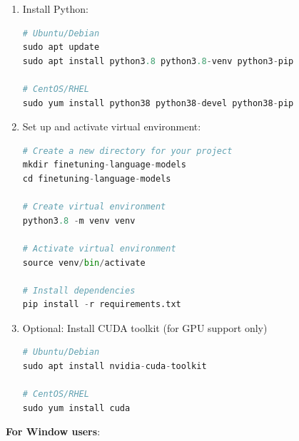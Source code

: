 \begin{enumerate}
\item Install Python:

\begin{lstlisting}[language=Python, caption=Download Python, basicstyle=\ttfamily\footnotesize, keywordstyle=\color{blue}]
# Ubuntu/Debian
sudo apt update
sudo apt install python3.8 python3.8-venv python3-pip

# CentOS/RHEL
sudo yum install python38 python38-devel python38-pip
\end{lstlisting}
\item Set up and activate virtual environment:
\begin{lstlisting}[language=Python, caption=Virtual env, basicstyle=\ttfamily\footnotesize, keywordstyle=\color{blue}]
# Create a new directory for your project
mkdir finetuning-language-models
cd finetuning-language-models

# Create virtual environment
python3.8 -m venv venv

# Activate virtual environment
source venv/bin/activate

# Install dependencies
pip install -r requirements.txt
\end{lstlisting}
\item Optional: Install CUDA toolkit (for GPU support only)
\begin{lstlisting}[language=Python, caption=CUDA, basicstyle=\ttfamily\footnotesize, keywordstyle=\color{blue}]
# Ubuntu/Debian
sudo apt install nvidia-cuda-toolkit

# CentOS/RHEL
sudo yum install cuda
\end{lstlisting}
\end{enumerate}


\textbf{For Window users}:

